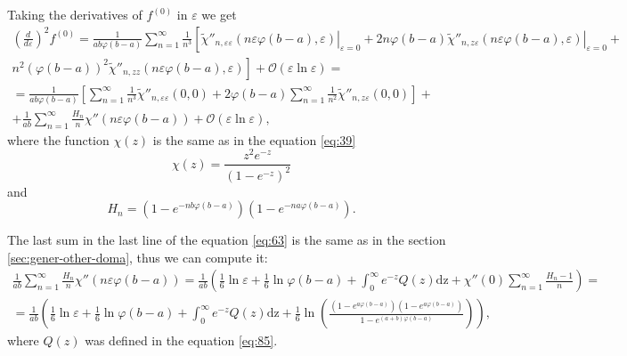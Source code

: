 \documentclass{article}
\newcommand{\dz}{\mathrm{dz}}
\begin{document}
Taking the derivatives of $f^{(0)}$ in $\varepsilon$ we get
\begin{multline}
  \label{eq:63}
  \left(\frac{d}{d\varepsilon}\right)^{2} f^{(0)}=\frac{1}{ab\varphi(b-a)} \sum_{n=1}^{\infty}
  \frac{1}{n^{3}}\left[
    \left.\tilde{\chi}''_{n,\varepsilon\varepsilon}\left(n\varepsilon\varphi(b-a),\varepsilon\right)\right|_{\varepsilon=0}+
    2n\varphi(b-a)\left.\tilde{\chi}''_{n,z\varepsilon}\left(n\varepsilon\varphi(b-a),\varepsilon\right)\right|_{\varepsilon=0}+\right.\\\left.
      n^{2}\left(\varphi(b-a)\right)^{2}\tilde{\chi}''_{n,zz}\left(n\varepsilon\varphi(b-a),\varepsilon\right)  \right]+
    \mathcal{O}(\varepsilon \ln \varepsilon)=\\
    =\frac{1}{ab\varphi(b-a)}\left[\sum_{n=1}^{\infty} \frac{1}{n^{3}}
      \tilde{\chi}''_{n,\varepsilon\varepsilon}(0,0)+2\varphi(b-a)\sum_{n=1}^{\infty}\frac{1}{n^{2}}\tilde{\chi}''_{n,z\varepsilon}(0,0)\right]+
    \\
    +\frac{1}{ab}\sum_{n=1}^{\infty}\frac{H_{n}}{n}\chi''\left(n\varepsilon\varphi(b-a)\right)+\mathcal{O}(\varepsilon\ln \varepsilon),
\end{multline}
where the function $\chi(z)$ is the same as in the equation \eqref{eq:39}
\begin{equation}
  \label{eq:64}
  \chi(z)=\frac{z^{2} e^{-z}}{\left(1-e^{-z}\right)^{2}}
\end{equation}
and
\begin{equation}
  \label{eq:65}
  H_{n}=\left(1-e^{-nb\varphi(b-a)}\right) \left(1-e^{-na\varphi(b-a)}\right).
\end{equation}

The last sum in the last line of the equation \eqref{eq:63} is the same as in the section
\ref{sec:gener-other-doma}, thus we can compute it:
\begin{multline}
  \label{eq:66}
  \frac{1}{ab}\sum_{n=1}^{\infty}\frac{H_{n}}{n}\chi''\left(n\varepsilon \varphi(b-a)\right)=
  \frac{1}{ab}\left(\frac{1}{6}\ln \varepsilon +\frac{1}{6}\ln \varphi(b-a)+ \int_{0}^{\infty}
    e^{-z}Q(z) \dz+\chi''(0)\sum_{n=1}^{\infty}\frac{H_{n}-1}{n}\right)=\\
  =\frac{1}{ab}\left(\frac{1}{6}\ln \varepsilon +\frac{1}{6}\ln \varphi(b-a)+ \int_{0}^{\infty}
    e^{-z}Q(z) \dz+\frac{1}{6}\ln\left(\frac{\left(1-e^{a\varphi(b-a)}\right)\left(1-e^{a\varphi(b-a)}\right)}{1-e^{(a+b)\varphi(b-a)}}\right)\right),
\end{multline}
where $Q(z)$ was defined in the equation \eqref{eq:85}.
\end{document}
